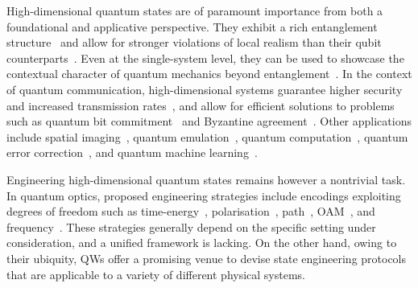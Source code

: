 High-dimensional quantum states are of paramount importance from both a foundational and applicative perspective. They exhibit a rich entanglement structure~\cite{horodecki2009quantum} and allow for stronger violations of local realism than their qubit counterparts~\cite{vértesi2010closing,brunner2014bell, lapkiewicz2011experimental}.
Even at the single-system level, they can be used to showcase the contextual character of quantum mechanics beyond entanglement~\cite{klyachko2008simple,lapkiewicz2011experimental}. 
In the context of quantum communication, high-dimensional systems guarantee higher security and increased transmission rates~\cite{bechmannpasquinucci2000quantum, cerf2002security, bru2002optimal, acin2003security, karimipour2002quantum, durt2004security, nunn2013largealphabet, mower2013highdimensional, lee2014entanglementbased, zhong2015photonefficient}, and allow for efficient solutions to problems such as quantum bit commitment~\cite{langford2004measuring} and  Byzantine agreement~\cite{fitzi2001quantum}.
Other applications include spatial imaging~\cite{howland2013efficient}, quantum emulation~\cite{buluta2009quantum,neeley2009emulation}, quantum computation~\cite{bartlett2002quantum, ralph2007efficient,lanyon2008simplifying,campbell2012magicstate,campbell2014enhanced}, quantum error correction~\cite{chuang1997bosonic,duclos-cianci2013kitaev,michael2016class}, and quantum machine learning~\cite{paparo2014quantum}.

Engineering high-dimensional quantum states remains however a nontrivial task.
In quantum optics, proposed engineering strategies include encodings exploiting degrees of freedom such as time-energy~\cite{thew2004belltype, bessire2014versatile}, polarisation~\cite{bogdanov2004qutrit}, path~\cite{osullivanhale2005pixel,hu2020experimental}, \ac{OAM}~\cite{mair2001entanglement, mclaren2012entangled, krenn2013entangled, krenn2014generation, zhang2016engineering}, and frequency~\cite{bernhard2013shaping, jin2016simple}. These strategies generally depend on the specific setting under consideration, and a unified framework is lacking. 
On the other hand, owing to their ubiquity, QWs offer a promising venue to devise state engineering protocols that are applicable to a variety of different physical systems.

